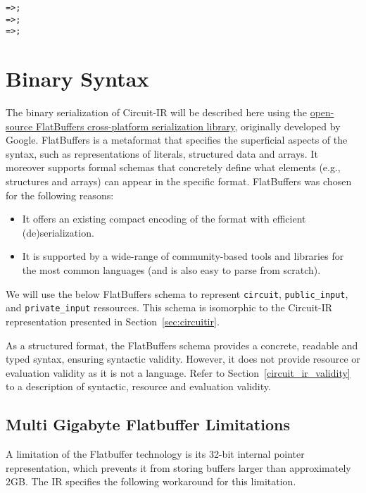 \begin{appendices}
\begin{alltt}
 =>  \term{,}  ;
 =>  ;
 =>  \term{:}  ;
\end{alltt}

\section{Binary Syntax}\label{binary_syntax}
The binary serialization of Circuit-IR will be described here using the \href{https://google.github.io/flatbuffers/}{open-source FlatBuffers cross-platform serialization library}, originally developed by Google.
FlatBuffers is a metaformat that specifies the superficial aspects of the syntax, such as representations of literals, structured data and arrays.
It moreover supports formal schemas that concretely define what elements (e.g., structures and arrays) can appear in the specific format.
FlatBuffers was chosen for the following reasons:
\begin{itemize}
\item It offers an existing compact encoding of the format with efficient (de)serialization.
\item It is supported by a wide-range of community-based tools and libraries for the most common languages (and is also easy to parse from scratch).
\end{itemize}

We will use the below FlatBuffers schema to represent \texttt{circuit}, \texttt{public\_input}, and \texttt{private\_input} ressources. This schema is isomorphic to the Circuit-IR representation presented in Section~\ref{sec:circuitir}.



As a structured format, the FlatBuffers schema provides a concrete, readable and typed syntax,
ensuring syntactic validity.
However, it does not provide resource or evaluation validity as it is not a language.
Refer to Section~\ref{circuit_ir_validity} to a description of syntactic, resource and evaluation validity.

\subsection{Multi Gigabyte Flatbuffer Limitations}
A limitation of the Flatbuffer technology is its 32-bit internal pointer representation, which prevents it from storing buffers larger than approximately 2GB.
The IR specifies the following workaround for this limitation.


\end{appendices}
